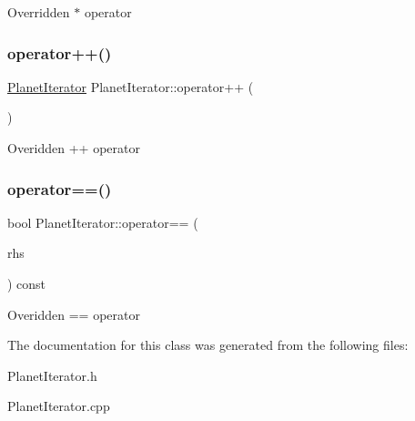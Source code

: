 Overridden $\ast$ operator \mbox{\label{classPlanetIterator_a8e057fb430e49f56f756c070e95587b3}} 
\subsubsection{\texorpdfstring{operator++()}{operator++()}}
{\footnotesize\ttfamily \hyperlink{classPlanetIterator}{Planet\+Iterator} Planet\+Iterator\+::operator++ (\begin{DoxyParamCaption}{ }\end{DoxyParamCaption})}

Overidden ++ operator \mbox{\label{classPlanetIterator_a8c8b0f27933c69f40efd523815acce3a}} 
\subsubsection{\texorpdfstring{operator==()}{operator==()}}
{\footnotesize\ttfamily bool Planet\+Iterator\+::operator== (\begin{DoxyParamCaption}\item[{const \hyperlink{classPlanetIterator}{Planet\+Iterator} \&}]{rhs }\end{DoxyParamCaption}) const}

Overidden == operator 

The documentation for this class was generated from the following files\+:\begin{DoxyCompactItemize}
\item 
Planet\+Iterator.\+h\item 
Planet\+Iterator.\+cpp\end{DoxyCompactItemize}

